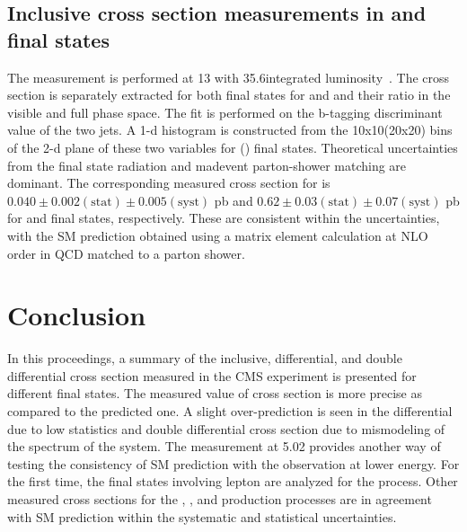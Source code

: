  \subsection{Inclusive \texorpdfstring{\ttbb}{ttbb} cross section measurements in \texorpdfstring{\ljets}{ljets} and \texorpdfstring{\dilep}{dilep} final states}
 The measurement is performed at 13 \TeV with 35.6\fbinv integrated luminosity~\cite{CMS:2020grm}. 
 The cross section is separately extracted for both final states for \ttbar and \ttjj and their ratio
 in the visible and full phase space. The fit is performed on the b-tagging discriminant value of 
 the two jets. A 1-d histogram is constructed from the 10x10(20x20) bins of the 2-d plane of these 
 two variables for \ljets (\dilep) final states. Theoretical uncertainties from the final state
 radiation and madevent parton-shower matching are dominant. The corresponding measured cross
 section for \ttbb is $0.040 \pm 0.002 (\text{stat}) \pm 0.005 (\text{syst})$ pb and 
 $0.62 \pm 0.03 (\text{stat}) \pm 0.07 (\text{syst})$ pb for \ljets and \dilep final states, 
 respectively. These are consistent within the uncertainties, with the SM prediction obtained using 
 a matrix element calculation at NLO order in QCD matched to a parton shower.

 \section{Conclusion}
 In this proceedings, a summary of the inclusive, differential, and double differential cross section
 measured in the CMS experiment is presented for different final states. The measured value of 
 \ttbar cross section is more precise as compared to the predicted one. A slight over-prediction
 is seen in the differential \ttgamma due to low statistics and double differential \ttbar cross 
 section due to mismodeling of the \pt spectrum of the \ttbar system. The \ttbar measurement at
 5.02 \TeV provides another way of testing the consistency of SM prediction with the observation
 at lower energy. For the first time, the final states involving \PGt lepton are analyzed for the
 \ttbar process. Other measured cross sections for the \PQt\PW, \ttgamma, \ttcc and \ttbb 
 production processes are in agreement with SM prediction within the systematic and statistical 
 uncertainties.

